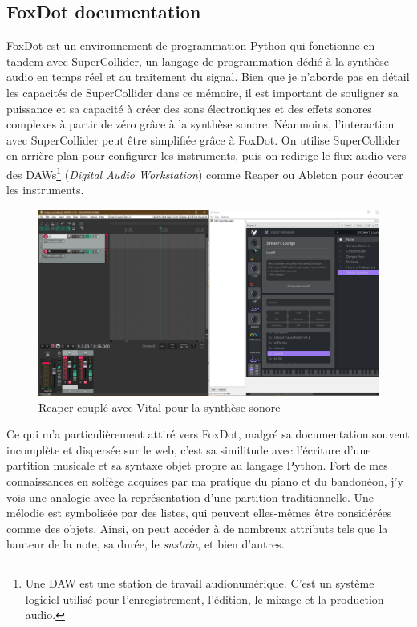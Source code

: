 \newpage
\subsection*{FoxDot documentation}
FoxDot est un environnement de programmation Python qui fonctionne en tandem avec SuperCollider, un langage de programmation dédié à la synthèse audio en temps réel et au traitement du signal. Bien que je n'aborde pas en détail les capacités de SuperCollider dans ce mémoire, il est important de souligner sa puissance et sa capacité à créer des sons électroniques et des effets sonores complexes à partir de zéro grâce à la synthèse sonore. Néanmoins, l'interaction avec SuperCollider peut être simplifiée grâce à FoxDot. On utilise SuperCollider en arrière-plan pour configurer les instruments, puis on redirige le flux audio vers des DAWs\footnote{Une DAW est une station de travail audionumérique. C'est un système logiciel utilisé pour l'enregistrement, l'édition, le mixage et la production audio.} (\textit{Digital Audio Workstation}) comme Reaper ou Ableton pour écouter les instruments.

\begin{figure}[h]
  \begin{minipage}[b]{1.0\linewidth}
    \centering
    \includegraphics[width=.5\linewidth]{images/experiments/reaper00.PNG}
    \caption{Reaper couplé avec Vital pour la synthèse sonore}
    \label{reaper00}
  \end{minipage}
\end{figure}


Ce qui m'a particulièrement attiré vers FoxDot, malgré sa documentation souvent incomplète et dispersée sur le web, c'est sa similitude avec l'écriture d'une partition musicale et sa syntaxe objet propre au langage Python. Fort de mes connaissances en solfège acquises par ma pratique du piano et du bandonéon, j'y vois une analogie avec la représentation d'une partition traditionnelle. Une mélodie est symbolisée par des listes, qui peuvent elles-mêmes être considérées comme des objets. Ainsi, on peut accéder à de nombreux attributs tels que la hauteur de la note, sa durée, le \textit{sustain}, et bien d'autres.


